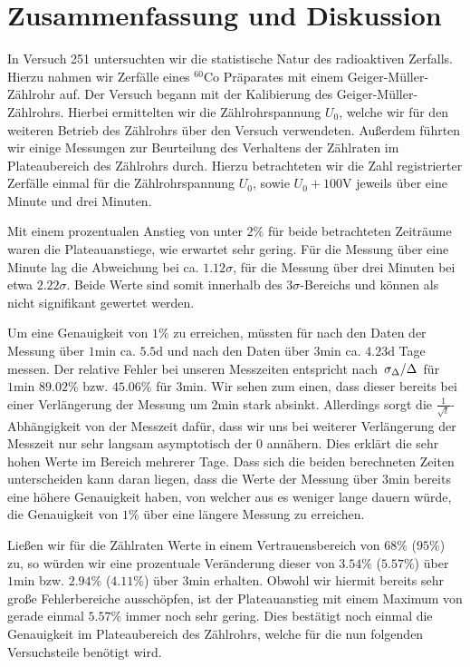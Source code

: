 \section{Zusammenfassung und Diskussion}

In Versuch 251 untersuchten wir die statistische Natur des radioaktiven Zerfalls. Hierzu nahmen wir Zerfälle eines $^{60}$Co Präparates mit einem Geiger-Müller-Zählrohr auf. Der Versuch begann mit der Kalibierung des Geiger-Müller-Zählrohrs. Hierbei ermittelten wir die Zählrohrspannung $U_0$, welche wir für den weiteren Betrieb des Zählrohrs über den Versuch verwendeten. Außerdem führten wir einige Messungen zur Beurteilung des Verhaltens der Zählraten im Plateaubereich des Zählrohrs durch. Hierzu betrachteten wir die Zahl registrierter Zerfälle einmal für die Zählrohrspannung $U_0$, sowie $U_0 + 100\si{\volt}$ jeweils über eine Minute und drei Minuten.

Mit einem prozentualen Anstieg von unter $2 \%$ für beide betrachteten Zeiträume waren die Plateauanstiege, wie erwartet sehr gering. Für die Messung über eine Minute lag die Abweichung bei ca. $1.12\sigma$, für die Messung über drei Minuten bei etwa $2.22\sigma$. Beide Werte sind somit innerhalb des $3\sigma$-Bereichs und können als nicht signifikant gewertet werden.

Um eine Genauigkeit von $1\%$ zu erreichen, müssten für nach den Daten der Messung über $1\si{\minute}$ ca. $5.5\si{\day}$ und nach den Daten über $3\si{\minute}$ ca. $4.23\si{\day}$ Tage messen. Der relative Fehler bei unseren Messzeiten entspricht nach $\flatfrac{\sigma_\Delta}{\Delta}$ für $1\si{\minute}$ $89.02\%$ bzw. $45.06\%$ für $3\si{\minute}$. Wir sehen zum einen, dass dieser bereits bei einer Verlängerung der Messung um $2 \si{\minute}$ stark absinkt. Allerdings sorgt die $\frac{1}{\sqrt{t}}$-Abhängigkeit von der Messzeit dafür, dass wir uns bei weiterer Verlängerung der Messzeit nur sehr langsam asymptotisch der 0 annähern. Dies erklärt die sehr hohen Werte im Bereich mehrerer Tage. Dass sich die beiden berechneten Zeiten unterscheiden kann daran liegen, dass die Werte der Messung über $3 \si{\minute}$ bereits eine höhere Genauigkeit haben, von welcher aus es weniger lange dauern würde, die Genauigkeit von $1\%$ über eine längere Messung zu erreichen.

Ließen wir für die Zählraten Werte in einem Vertrauensbereich von $68\%$ ($95\%$) zu, so würden wir eine prozentuale Veränderung dieser von $3.54\%$ ($5.57\%$) über $1 \si{\minute}$ bzw. $2.94\%$ ($4.11\%$) über $3 \si{\minute}$ erhalten. Obwohl wir hiermit bereits sehr große Fehlerbereiche ausschöpfen, ist der Plateauanstieg mit einem Maximum von gerade einmal $5.57\%$ immer noch sehr gering. Dies bestätigt noch einmal die Genauigkeit im Plateaubereich des Zählrohrs, welche für die nun folgenden Versuchsteile benötigt wird.

